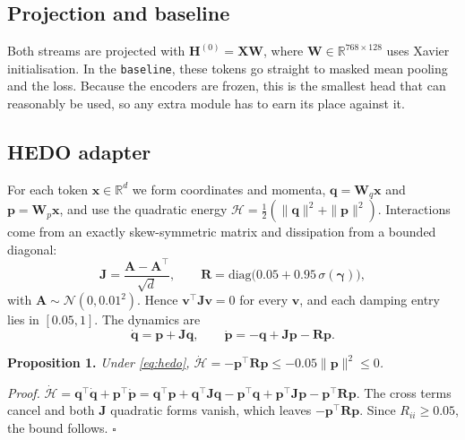 \documentclass[pdflatex,sn-mathphys-num]{sn-jnl}
\begin{document}
\subsection{Projection and baseline}
Both streams are projected with $\mathbf{H}^{(0)}=\mathbf{X}\mathbf{W}$, where $\mathbf{W}\in\mathbb{R}^{768\times128}$ uses Xavier initialisation. In the \texttt{baseline}, these tokens go straight to masked mean pooling and the loss. Because the encoders are frozen, this is the smallest head that can reasonably be used, so any extra module has to earn its place against it.

\subsection{HEDO adapter}
For each token $\mathbf{x}\in\mathbb{R}^d$ we form coordinates and momenta, $\mathbf{q}=\mathbf{W}_q\mathbf{x}$ and $\mathbf{p}=\mathbf{W}_p\mathbf{x}$, and use the quadratic energy $\mathcal{H}=\tfrac12(\|\mathbf{q}\|^2+\|\mathbf{p}\|^2)$. Interactions come from an exactly skew-symmetric matrix and dissipation from a bounded diagonal:
\begin{equation}
\mathbf{J}=\frac{\mathbf{A}-\mathbf{A}^\top}{\sqrt d},\qquad
\mathbf{R}=\mathrm{diag}\big(0.05+0.95\,\sigma(\bm\gamma)\big),
\label{eq:JR}
\end{equation}
with $\mathbf{A}\sim\mathcal{N}(0,0.01^2)$. Hence $\mathbf{v}^\top\mathbf{J}\mathbf{v}=0$ for every $\mathbf{v}$, and each damping entry lies in $[0.05,1]$. The dynamics are
\begin{equation}
\dot{\mathbf{q}}=\mathbf{p}+\mathbf{J}\mathbf{q},\qquad
\dot{\mathbf{p}}=-\mathbf{q}+\mathbf{J}\mathbf{p}-\mathbf{R}\mathbf{p}.
\label{eq:hedo}
\end{equation}

\noindent\textbf{Proposition 1.} \emph{Under \eqref{eq:hedo}, $\dot{\mathcal{H}}=-\mathbf{p}^\top\mathbf{R}\mathbf{p}\le-0.05\|\mathbf{p}\|^2\le0$.}

\noindent\emph{Proof.} $\dot{\mathcal{H}}=\mathbf{q}^\top\dot{\mathbf{q}}+\mathbf{p}^\top\dot{\mathbf{p}}=\mathbf{q}^\top\mathbf{p}+\mathbf{q}^\top\mathbf{J}\mathbf{q}-\mathbf{p}^\top\mathbf{q}+\mathbf{p}^\top\mathbf{J}\mathbf{p}-\mathbf{p}^\top\mathbf{R}\mathbf{p}$. The cross terms cancel and both $\mathbf{J}$ quadratic forms vanish, which leaves $-\mathbf{p}^\top\mathbf{R}\mathbf{p}$. Since $R_{ii}\ge0.05$, the bound follows. $\square$
\end{document}
